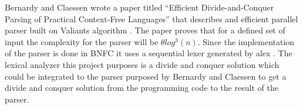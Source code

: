 Bernardy and Claessen \cite{bernardyefficient2013} wrote a paper titled 
``Efficient Divide-and-Conquer Parsing of Practical Context-Free Languages''
that describes and efficient parallel parser built on Valiants algorithm
\cite{valiantgeneral1975}. The paper proves that for a defined set of input
the complexity for the parser will be $\theta log^3(n)$.
Since the implementation of the parser is done in BNFC \cite{bnfc} it uses a
sequential lexer generated by alex \cite{alex}. The lexical analyzer this
project purposes is a divide and conquer solution which could be integrated to
the parser purposed by Bernardy and Claessen to get a divide and conquer
solution from the programming code to the result of the parser.
